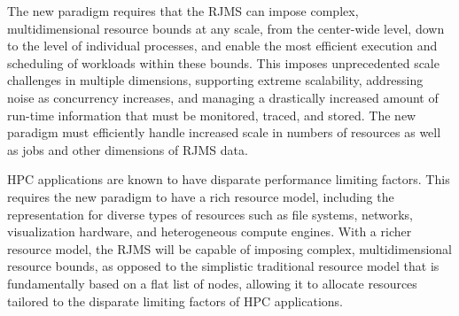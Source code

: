

The new paradigm requires that the RJMS can impose
complex, multidimensional resource bounds at any scale, 
from the center-wide level, down to the level of individual processes,
and enable the most efficient execution and
scheduling of workloads within these bounds.
This imposes unprecedented scale challenges
in multiple dimensions,
supporting extreme scalability, addressing noise as concurrency
increases, and managing a drastically increased amount of
run-time information that must be monitored, traced, and stored.
The new paradigm must efficiently handle increased scale in
numbers of resources as well as jobs and other dimensions 
of RJMS data.

HPC applications are known to have disparate performance 
limiting factors. This requires
the new paradigm to have a rich resource model, including
the 
representation for diverse
types of resources such as file systems, networks, visualization
hardware, and heterogeneous compute engines.
With a richer resource model, the RJMS will be capable of imposing
complex, multidimensional resource bounds, as opposed to the
simplistic traditional resource model that is fundamentally based on a
flat list of nodes, allowing it to 
allocate resources tailored to the disparate limiting
factors of HPC applications.  

